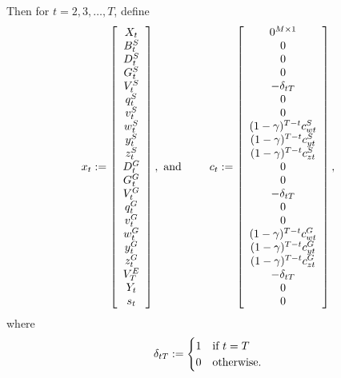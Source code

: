 Then for $t=2, 3, \ldots, T$, define
\begin{equation*}
x_t := \left[
\begin{array}{c}
	X_t\\
	B_t^S\\
	D_t^S\\
	G_t^S\\
	V_t^S\\
	q_t^S\\
	v_t^S\\
	w_t^S\\
	y_t^S\\
	z_t^S\\
	D_t^G\\
	G_t^G\\
	V_t^G\\
	q_t^G\\
	v_t^G\\
	w_t^G\\
	y_t^G\\
	z_t^G\\
	V_T^E\\
	Y_t\\
	s_t
\end{array}
\right],
\text{ and  } \hspace{0.3in}
c_t :=\left[
\begin{array}{c}
	0^{M\times 1}\\
	0\\
	0\\
	0\\
	-\delta_{tT}\\
	0\\
	0\\
	(1-\gamma)^{T-t} c^S_{wt}\\
	(1-\gamma)^{T-t} c^S_{yt}\\
	(1-\gamma)^{T-t} c^S_{zt}\\
	0\\
	0\\
	-\delta_{tT}\\
	0\\
	0\\
	(1-\gamma)^{T-t} c^G_{wt}\\
	(1-\gamma)^{T-t} c^G_{yt}\\
	(1-\gamma)^{T-t} c^G_{zt}\\
	-\delta_{tT}\\
	0\\	
	0
\end{array}
\right],
\end{equation*}
where
\begin{equation*}
\delta_{tT} := 
\begin{cases}
	1	&	\text{if $t=T$}\\
	0	&	\text{otherwise}.\\
\end{cases}
\end{equation*}

